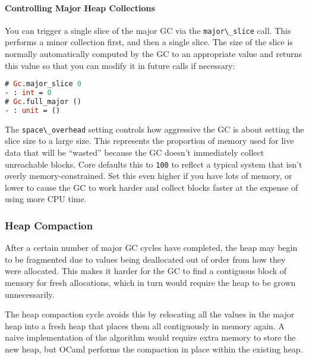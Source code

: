 \hypertarget{controlling-major-heap-collections}{%
\paragraph{Controlling Major Heap
Collections}\label{controlling-major-heap-collections}}

You can trigger a single slice of the major GC via the
\passthrough{\lstinline!major\_slice!} call. This performs a minor
collection first, and then a single slice. The size of the slice is
normally automatically computed by the GC to an appropriate value and
returns this value so that you can modify it in future calls if
necessary:

\begin{lstlisting}[language=Caml]
# Gc.major_slice 0
- : int = 0
# Gc.full_major ()
- : unit = ()
\end{lstlisting}

The \passthrough{\lstinline!space\_overhead!} setting controls how
aggressive the GC is about setting the slice size to a large size. This
represents the proportion of memory used for live data that will be
``wasted'' because the GC doesn't immediately collect unreachable
blocks. Core defaults this to \passthrough{\lstinline!100!} to reflect a
typical system that isn't overly memory-constrained. Set this even
higher if you have lots of memory, or lower to cause the GC to work
harder and collect blocks faster at the expense of using more CPU time.

\hypertarget{heap-compaction}{%
\subsubsection{Heap Compaction}\label{heap-compaction}}

After a certain number of major GC cycles have completed, the heap may
begin to be fragmented due to values being deallocated out of order from
how they were allocated. This makes it harder for the GC to find a
contiguous block of memory for fresh allocations, which in turn would
require the heap to be grown unnecessarily.

The heap compaction cycle avoids this by relocating all the values in
the major heap into a fresh heap that places them all contiguously in
memory again. A naive implementation of the algorithm would require
extra memory to store the new heap, but OCaml performs the compaction in
place within the existing heap.

